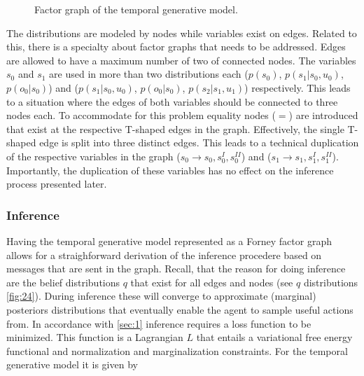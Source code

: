 \begin{figure}[htbp]

    \caption{Factor graph of the temporal generative model.}
    \label{fig:8}
\end{figure}
The distributions are modeled by nodes while variables exist on edges. Related to this, there is a specialty about factor graphs that needs to be addressed. Edges are allowed to have a maximum number of two of connected nodes. The variables \(s_0\) and \(s_1\) are used in more than two distributions each (\(p(s_0)\), \(p(s_1|s_0,u_0)\), \(p(o_0|s_0)\)) and (\(p(s_1|s_0,u_0)\), \(p(o_0|s_0)\), \(p(s_2|s_1,u_1)\)) respectively. This leads to a situation where the edges of both variables should be connected to three nodes each. To accommodate for this problem equality nodes (\(=\)) are introduced that exist at the respective T-shaped edges in the graph. Effectively, the single T-shaped edge is split into three distinct edges. This leads to a technical duplication of the respective variables in the graph (\(s_0 \rightarrow s_0, s^{\scriptscriptstyle I}_0, s^{\scriptscriptstyle II}_0\)) and (\(s_1 \rightarrow s_1, s^{\scriptscriptstyle I}_1, s^{\scriptscriptstyle II}_1\)). Importantly, the duplication of these variables has no effect on the inference process presented later.

\subsubsection{Inference}

Having the temporal generative model represented as a Forney factor graph allows for a straighforward derivation of the inference procedere based on messages that are sent in the graph. Recall, that the reason for doing inference are the belief distributions \(q\) that exist for all edges and nodes (see \(q\) distributions \cref{fig:24}). During inference these will converge to approximate (marginal) posteriors distributions that eventually enable the agent to sample useful actions from.
In accordance with \cref{sec:1} inference requires a loss function to be minimized. This function is a Lagrangian \(L\) that entails a variational free energy functional and normalization and marginalization constraints.
For the temporal generative model it is given by

